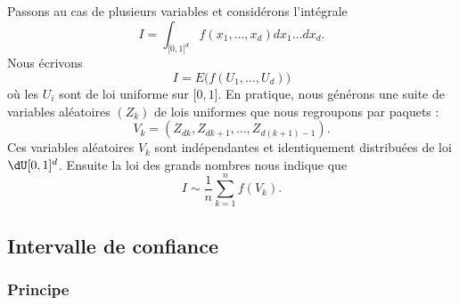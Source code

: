 Passons au cas de plusieurs variables et considérons l'intégrale
\begin{equation}
	I=\int_{\mathopen[ 0 , 1 \mathclose]^d}f(x_1,\ldots,x_d)dx_1\ldots dx_d.
\end{equation}
Nous écrivons
\begin{equation}
	I=E\big( f(U_1,\ldots,U_d) \big)
\end{equation}
où les \( U_i\) sont de loi uniforme sur \( \mathopen[ 0 , 1 \mathclose]\). En pratique, nous générons une suite de variables aléatoires \( (Z_k)\) de lois uniformes que nous regroupons par paquets :
\begin{equation}
	V_k=(Z_{dk},Z_{dk+1},\ldots,Z_{d(k+1)-1}).
\end{equation}
Ces variables aléatoires \( V_k\) sont indépendantes et identiquement distribuées de loi \( \dU\mathopen[ 0 , 1 \mathclose]^{d}\). Ensuite la loi des grands nombres nous indique que
\begin{equation}
	I\sim\frac{1}{ n }\sum_{k=1}^nf(V_k).
\end{equation}

\subsection{Intervalle de confiance}

\subsubsection{Principe}

